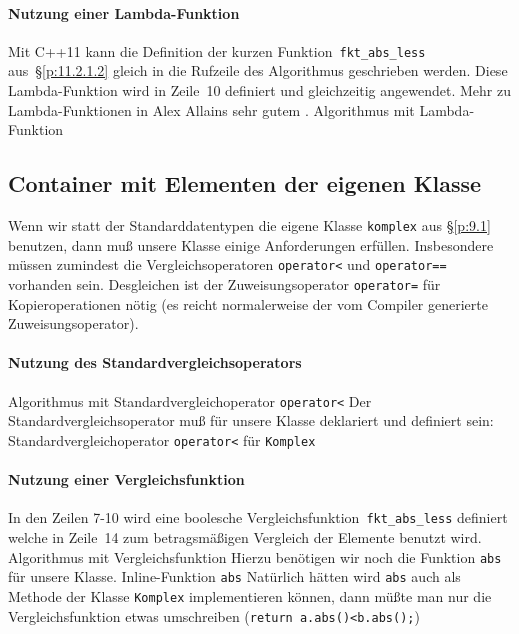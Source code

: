 \paragraph{Nutzung einer Lambda-Funktion} 
\label{p:11.2.1.4}
%
Mit C++11 kann die Definition der kurzen Funktion~\texttt{fkt\_abs\_less} aus~\S\ref{p:11.2.1.2} 
gleich in die Rufzeile des Algorithmus geschrieben werden.
Diese Lambda-Funktion wird in Zeile~10 definiert und gleichzeitig angewendet.
Mehr zu Lambda-Funktionen in Alex Allains sehr gutem 
.
%
{Algorithmus mit Lambda-Funktion}
%


\subsection{Container mit Elementen der eigenen Klasse}
\label{p:11.2.2}
Wenn wir statt der Standarddatentypen die eigene Klasse \verb|komplex| aus \S\ref{p:9.1} benutzen, 
dann muß unsere Klasse einige Anforderungen erfüllen. 
Insbesondere müssen zumindest die Vergleichsoperatoren \verb|operator<| und \verb|operator==| vorhanden sein. 
Desgleichen ist der Zuweisungsoperator  \verb|operator=| für Kopieroperationen nötig 
(es reicht normalerweise der vom Compiler generierte Zuweisungsoperator).
%
%
\paragraph{Nutzung des Standardvergleichsoperators} 
\label{p:11.2.2.1}
\mbox{}
{Algorithmus mit Standardvergleichoperator \texttt{operator<}}
Der Standardvergleichsoperator muß für unsere Klasse deklariert und definiert sein:
{Standardvergleichoperator \texttt{operator<} für \texttt{Komplex}}

\paragraph{Nutzung einer Vergleichsfunktion} 
\label{p:11.2.2.2}
%
In den Zeilen 7-10 wird eine boolesche Vergleichsfunktion~\texttt{fkt\_abs\_less} definiert welche in Zeile~14 
zum betragsmäßigen Vergleich der Elemente benutzt wird. 
%
{Algorithmus mit Vergleichsfunktion}
%
Hierzu benötigen wir noch die Funktion \verb|abs| für unsere Klasse.
{Inline-Funktion \texttt{abs}}
Natürlich hätten wird \verb|abs| auch als Methode der Klasse \texttt{Komplex} implementieren können, dann 
müßte man nur die Vergleichsfunktion etwas umschreiben (\verb|return a.abs()<b.abs();|)
%

